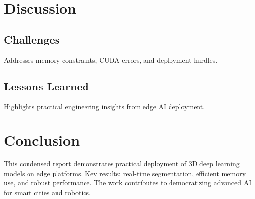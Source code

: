 \documentclass[12pt,a4paper]{report}
\begin{document}
\chapter{Discussion}
\section{Challenges}
Addresses memory constraints, CUDA errors, and deployment hurdles.
\section{Lessons Learned}
Highlights practical engineering insights from edge AI deployment.
\chapter{Conclusion}
This condensed report demonstrates practical deployment of 3D deep learning models on edge platforms. Key results: real-time segmentation, efficient memory use, and robust performance. The work contributes to democratizing advanced AI for smart cities and robotics.
\newpage


\end{document}

